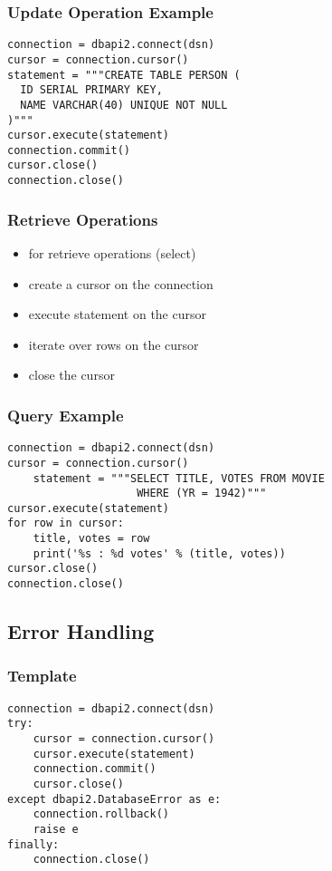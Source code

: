 \documentclass[dvipsnames]{beamer}
\theoremstyle{plain}
\begin{document}
\begin{frame}[fragile]
  \frametitle{Update Operation Example}

  \begin{lstlisting}
connection = dbapi2.connect(dsn)
cursor = connection.cursor()
statement = """CREATE TABLE PERSON (
  ID SERIAL PRIMARY KEY,
  NAME VARCHAR(40) UNIQUE NOT NULL
)"""
cursor.execute(statement)
connection.commit()
cursor.close()
connection.close()
  \end{lstlisting}
\end{frame}

\begin{frame}
  \frametitle{Retrieve Operations}

  \begin{itemize}
    \item for retrieve operations (select)

    \bigskip
    \item create a cursor on the connection
    \item execute statement on the cursor
    \item iterate over rows on the cursor
    \item close the cursor
  \end{itemize}
\end{frame}

\begin{frame}[fragile]
  \frametitle{Query Example}

  \begin{lstlisting}
connection = dbapi2.connect(dsn)
cursor = connection.cursor()
    statement = """SELECT TITLE, VOTES FROM MOVIE
                    WHERE (YR = 1942)"""
cursor.execute(statement)
for row in cursor:
    title, votes = row
    print('%s : %d votes' % (title, votes))
cursor.close()
connection.close()
  \end{lstlisting}
\end{frame}

\subsection{Error Handling}

\begin{frame}[fragile]
  \frametitle{Template}

  \begin{lstlisting}
connection = dbapi2.connect(dsn)
try:
    cursor = connection.cursor()
    cursor.execute(statement)
    connection.commit()
    cursor.close()
except dbapi2.DatabaseError as e:
    connection.rollback()
    raise e
finally:
    connection.close()
  \end{lstlisting}
\end{frame}
\end{document}
